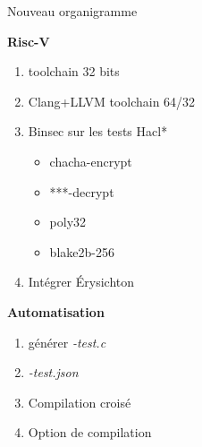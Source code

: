 \documentclass[A4,svgnames,9pt,aspectratio=169]{beamer}
\begin{document}

\begin{frame}{Nouveau organigramme}
   \begin{center}
    \begin{minipage}[t]{0.45\textwidth}
      \textbf{Risc-V}
      \begin{enumerate}
          \item toolchain 32 bits
          \item Clang+LLVM toolchain 64/32
          \item Binsec sur les tests Hacl*
          \begin{itemize}
            \item chacha-encrypt
            \item ***-decrypt
            \item poly32
            \item blake2b-256
          \end{itemize}
          \item Intégrer Érysichton
      \end{enumerate}
    \end{minipage}
    \hspace{5pt}
    \begin{minipage}[t]{0.45\textwidth}
      \textbf{Automatisation}
      \begin{enumerate}
          \item générer \textit{-test.c}
          \item \textit{-test.json}
          \item Compilation croisé
          \item Option de compilation
      \end{enumerate}
    \end{minipage}

    \vspace{1cm}


\end{center}
\end{frame}
\end{document}
